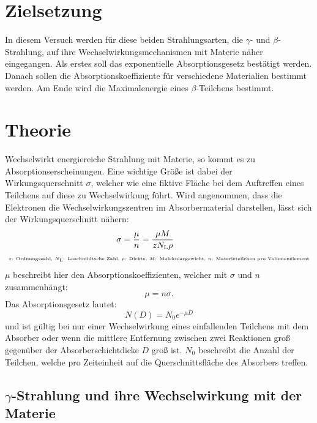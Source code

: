 \section{Zielsetzung}
\label{sec:Zielsetzung}

In diesem Versuch werden für diese beiden Strahlungsarten, die $\gamma$- und $\beta$-Strahlung, auf ihre Wechselwirkungsmechanismen mit Materie näher eingegangen. Als erstes soll das exponentielle Absorptionsgesetz bestätigt werden. Danach sollen die Absorptionskoeffiziente für verschiedene Materialien bestimmt werden. Am Ende wird die Maximalenergie eines $\beta$-Teilchens bestimmt.

\section{Theorie}
\label{sec:Theorie}

Wechselwirkt energiereiche Strahlung mit Materie, so kommt es zu Absorptionserscheinungen. Eine wichtige Größe ist dabei der Wirkungsquerschnitt $\sigma$, welcher wie eine fiktive Fläche bei dem Auftreffen eines Teilchens auf diese zu Wechselwirkung führt.
Wird angenommen, dass die Elektronen die Wechselwirkungszentren im Absorbermaterial darstellen, lässt sich der Wirkungsquerschnitt nähern:
\begin{align*}
\sigma &= \frac{\mu}{n} = \frac{\mu M}{z N_\text{L} \rho} \\
\tiny \text{$z$: Ordnungszahl, $N_\text{L}$: Loschmidtsche Zahl, }&\text{\tiny $\rho$: Dichte, $M$: Molekulargewicht, $n$: Materieteilchen pro Volumenelement} \nonumber
\end{align*}
$\mu$ beschreibt hier den Absorptionskoeffizienten, welcher mit $\sigma$ und $n$ zusammenhängt:
\begin{equation*}
\mu =n \sigma.
\end{equation*}
Das Absorptionsgesetz lautet:
\begin{equation}
\label{eq:eq1}
N(D) =N_0 e^{-\mu D} 
\end{equation}
und ist gültig bei nur einer Wechselwirkung eines einfallenden Teilchens mit dem Absorber oder wenn die mittlere Entfernung zwischen zwei Reaktionen groß gegenüber der Absorberschichtdicke $D$ groß ist. $N_0$ beschreibt die Anzahl der Teilchen, welche pro Zeiteinheit auf die Querschnittsfläche des Absorbers treffen. 

\subsection{\texorpdfstring{$\gamma$}{gamma}-Strahlung und ihre Wechselwirkung mit der Materie}

